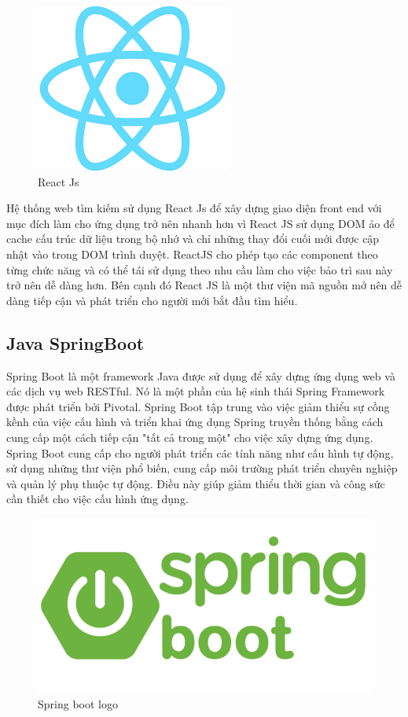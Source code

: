 \documentclass[../DoAn.tex]{subfiles}
\begin{document}
\begin{figure}[H]
    \centering
    \includegraphics[scale=0.7]{Hinhve/reactjs.png}
    \caption{React Js}
    \label{fig:my_label2}
\end{figure}

Hệ thống web tìm kiếm sử dụng React Js để xây dựng giao diện front end với mục đích làm cho ứng dụng trở nên nhanh hơn vì React JS sử dụng DOM ảo để cache cấu trúc dữ liệu trong bộ nhớ và chỉ những thay đổi cuối mới được cập nhật vào trong DOM trình duyệt. ReactJS cho phép tạo các component theo từng chức năng và có thể tái sử dụng theo nhu cầu làm cho việc bảo trì sau này trở nên dễ dàng hơn. Bên cạnh đó React JS là một thư viện mã nguồn mở nên dễ dàng tiếp cận và phát triển cho người mới bắt đầu tìm hiểu.
\subsection{Java SpringBoot}
\label{subsection:3.3.2}
Spring Boot là một framework Java được sử dụng để xây dựng ứng dụng web và các dịch vụ web RESTful. Nó là một phần của hệ sinh thái Spring Framework được phát triển bởi Pivotal. Spring Boot tập trung vào việc giảm thiểu sự cồng kềnh của việc cấu hình và triển khai ứng dụng Spring truyền thống bằng cách cung cấp một cách tiếp cận "tất cả trong một" cho việc xây dựng ứng dụng. Spring Boot cung cấp cho người phát triển các tính năng như cấu hình tự động, sử dụng những thư viện phổ biến, cung cấp môi trường phát triển chuyên nghiệp và quản lý phụ thuộc tự động. Điều này giúp giảm thiểu thời gian và công sức cần thiết cho việc cấu hình ứng dụng.

\begin{figure}[H]
    \centering
    \includegraphics[scale=0.6]{Hinhve/spring-boot-logo.png}
    \caption{Spring boot logo}
    \label{fig:my_label2}
\end{figure}
\end{document}
